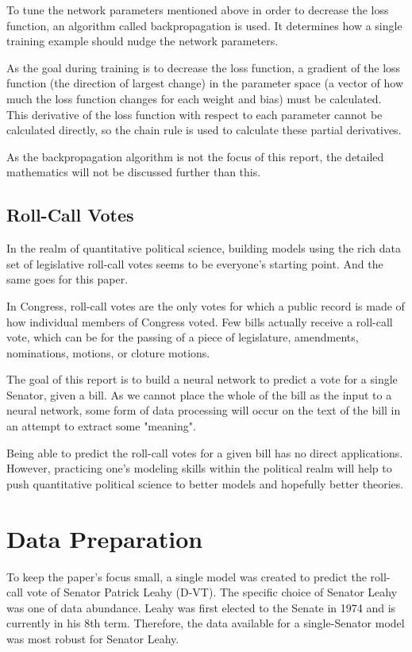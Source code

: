 \documentclass[%
 reprint,
 amsmath,amssymb,
 aps,
]{revtex4-2}
\begin{document}
To tune the network parameters mentioned above in order to decrease the loss function, an algorithm called backpropagation is used. It determines how a single training example should nudge the network parameters.

As the goal during training is to decrease the loss function, a gradient of the loss function (the direction of largest change) in the parameter space (a vector of how much the loss function changes for each weight and bias) must be calculated. This derivative of the loss function with respect to each parameter cannot be calculated directly, so the chain rule is used to calculate these partial derivatives\cite{Nielsen}.

As the backpropagation algorithm is not the focus of this report, the detailed mathematics will not be discussed further than this.

\subsection{Roll-Call Votes}

In the realm of quantitative political science, building models using the rich data set of legislative roll-call votes seems to be everyone's starting point\cite{Goldblatt2012HowAB}. And the same goes for this paper.

In Congress, roll-call votes are the only votes for which a public record is made of how individual members of Congress voted. Few bills actually receive a roll-call vote, which can be for the passing of a piece of legislature, amendments, nominations, motions, or cloture motions.

The goal of this report is to build a neural network to predict a vote for a single Senator, given a bill. As we cannot place the whole of the bill as the input to a neural network, some form of data processing will occur on the text of the bill in an attempt to extract some "meaning".

Being able to predict the roll-call votes for a given bill has no direct applications. However, practicing one's modeling skills within the political realm will help to push quantitative political science to better models and hopefully better theories.

\section{Data Preparation}

To keep the paper's focus small, a single model was created to predict the roll-call vote of Senator Patrick Leahy (D-VT). The specific choice of Senator Leahy was one of data abundance. Leahy was first elected to the Senate in 1974 and is currently in his 8th term. Therefore, the data available for a single-Senator model was most robust for Senator Leahy.
\end{document}
